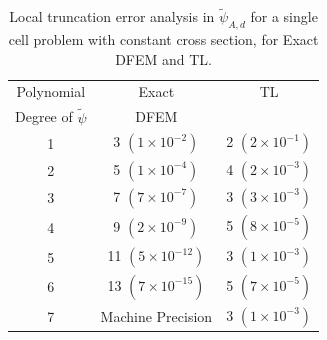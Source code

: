\begin{table}[!htp]
\centering
\caption{Local truncation error analysis in $\widetilde{\psi}_{A,d}$ for a single cell problem with constant cross section, for Exact DFEM and TL.}
\begin{tabular}{|c|c|c||} 
\hline
  Polynomial 										  & Exact 											& TL   \\
  Degree  of $\widetilde{\psi}$		&   DFEM											& {}	 \\
  	\hline
				1   											&  	3 $(1\times 10^{-2})$			& 2 $(2\times 10^{-1})$		 \\
		\hline
				2   											&   5 $(1\times 10^{-4})$			&  4 $(2\times 10^{-3})$	\\
		\hline	
				3   											&   7 $(7\times 10^{-7})$			& 3 $(3\times 10^{-3})$	\\
		\hline
				4   											&  9 $(2\times 10^{-9})$			& 5 $(8\times 10^{-5})$	\\
		\hline
				5   											&  11 $(5\times 10^{-12})$		& 3 $(1\times 10^{-3})$	\\
		\hline	
				6   											&  13 $(7\times 10^{-15})$		& 5 $(7\times 10^{-5})$	\\
		\hline
				7   											&  Machine Precision					& 3 $(1\times 10^{-3})$  \\
		\hline	
\end{tabular}
\label{tbl:taylor_avg_part1} 
\end{table}
